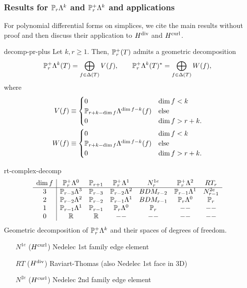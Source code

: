 \subsubsection{Results for $\P_r\Lambda^k$ and $\P_r^+\Lambda^k$ and applications}

For polynomial differential forms on simplices, we cite the main
results without proof and then discuss their application to $\Hdiv$
and $\Hcurl$.

\begin{Theorem}{decomp-pr-plus}
  Let $k,r\ge 1$. Then, $\P_r^+(\cell)$ admits a geometric decomposition
  \begin{gather}
    \P_r^+\Lambda^k(\cell) = \bigoplus_{f\in\Delta(\cell)} V(f),
    \qquad
    \P_r^+\Lambda^k(\cell)^* = \bigoplus_{f\in\Delta(\cell)} W(f),
  \end{gather}
  where
  \begin{align}
    V(f) \equiv
    \begin{cases}
      0 & \dim f < k\\
      \P_{r+k-\dim f} \Lambda^{\dim f-k}(f) &\text{else}\\
      0 & \dim f > r+k.
    \end{cases}
    \\
    W(f) \equiv
    \begin{cases}
      0 & \dim f < k\\
      \P_{r+k-\dim f} \Lambda^{\dim f-k}(f) &\text{else}\\
      0 & \dim f > r+k.
    \end{cases}
  \end{align}
\end{Theorem}

\begin{Example}{rt-complex-decomp}
  \begin{gather}
    \begin{array}{c|cccccc}
      \dim f
      & \P_r^+\Lambda^0 & \P_{r+1}
      & \P_r^+\Lambda^1 & N^{1e}_r
      & \P_r^+\Lambda^2 & RT_r \\\hline
      3 & \P_{r-3}\Lambda^3 & \P_{r-3} & \P_{r-2}\Lambda^2 & BDM_{r-2} & \P_{r-1}\Lambda^1 & N^{2e}_{r-1} \\
      2 & \P_{r-2}\Lambda^2 & \P_{r-2} & \P_{r-1}\Lambda^1 & BDM_{r-1} & \P_{r}\Lambda^0 & \P_r\\
      1 & \P_{r-1}\Lambda^1 & \P_{r-1} & \P_{r}\Lambda^0   & \P_r  & -- & -- \\
      0 & \R & \R & -- & -- & --& --
    \end{array}
  \end{gather}
  Geometric decomposition of $\P_r^+\Lambda^k$ and their spaces of degrees of freedom.
  \begin{itemize}
  \item [$N^{1e}$] ($\Hcurl$) Nedelec 1st family edge element
  \item [$RT$] ($\Hdiv$) Raviart-Thomas (also Nedelec 1st face in 3D)
  \item [$N^{2e}$] ($\Hcurl$) Nedelec 2nd family edge element
  \end{itemize}
\end{Example}

